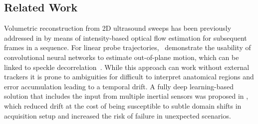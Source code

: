 \subsection{Related Work}
Volumetric reconstruction from 2D ultrasound sweeps has been previously addressed in \citep{el2023trackerless} by means of intensity-based optical flow estimation for subsequent frames in a sequence. For linear probe trajectories,~\citep{prevost20183d} demonstrate the usability of convolutional neural networks to estimate out-of-plane motion, which can be linked to speckle decorrelation~\citep{chen1997determination}. While this approach can work without external trackers it is prone to ambiguities for difficult to interpret anatomical regions and error accumulation leading to a temporal drift. A fully deep learning-based solution that includes the input from multiple inertial sensors was proposed in \citep{luo2023multi}, which reduced drift at the cost of being susceptible to subtle domain shifts in acquisition setup and increased the risk of failure in unexpected scenarios. 

